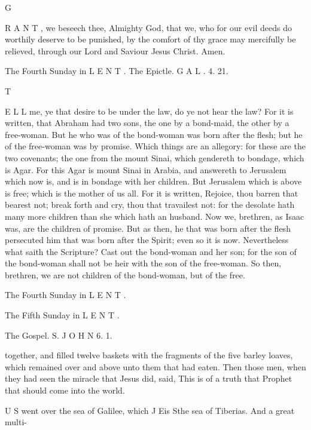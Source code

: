 G

R A N T , we beseech thee, Almighty God, that we, who for our evil deeds do worthily deserve to be punished, by the comfort of thy grace may mercifully be relieved, through our Lord and Saviour Jesus Christ. Amen.

The Fourth Sunday in L E N T . The Epictle. G A L . 4. 21.

T

E L L me, ye that desire to be under the law, do ye not hear the law? For it is written, that Abraham had two sons, the one by a bond-maid, the other by a free-woman. But he who was of the bond-woman was born after the flesh; but he of the free-woman was by promise. Which things are an allegory: for these are the two covenants; the one from the mount Sinai, which gendereth to bondage, which is Agar. For this Agar is mount Sinai in Arabia, and answereth to Jerusalem which now is, and is in bondage with her children. But Jerusalem which is above is free; which is the mother of us all. For it is written, Rejoice, thou barren that bearest not; break forth and cry, thou that travailest not: for the desolate hath many more children than she which hath an husband. Now we, brethren, as Isaac was, are the children of promise. But as then, he that was born after the flesh persecuted him that was born after the Spirit; even so it is now. Nevertheless what saith the Scripture? Cast out the bond-woman and her son; for the son of the bond-woman shall not be heir with the son of the free-woman. So then, brethren, we are not children of the bond-woman, but of the free.

The Fourth Sunday in L E N T .

The Fifth Sunday in L E N T .

The Gospel. S. J O H N 6. 1.

together, and filled twelve baskets with the fragments of the five barley loaves, which remained over and above unto them that had eaten. Then those men, when they had seen the miracle that Jesus did, said, This is of a truth that Prophet that should come into the world.

U S went over the sea of Galilee, which J Eis Sthe sea of Tiberias. And a great multi-

